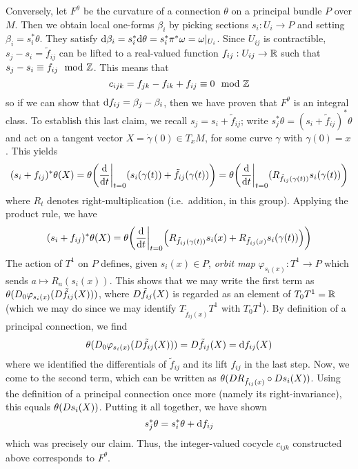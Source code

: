 \documentclass[parskip=half]{scrartcl}
\begin{document}
\begin{myproof}
	Conversely, let $F^\theta$ be the curvature of a connection $\theta$ on a principal bundle $P$ over $M$. Then we obtain local one-forms $\beta_i$ by picking sections $s_i:U_i\to P$ and setting $\beta_i=s_i^*\theta$. They satisfy $\mathrm{d} \beta_i=s_i^*\mathrm{d}\theta=s_i^*\pi^*\omega=\omega|_{U_i}$. Since $U_{ij}$ is contractible, $s_j-s_i=\tilde f_{ij}$ can be lifted to a real-valued function $f_{ij}:U_{ij}\to \mathbb{R}$ such that $s_j-s_i\equiv f_{ij}\mod {\mathbb{Z}}$. This means that 
	\begin{equation*}
		c_{ijk}=f_{jk}-f_{ik}+f_{ij}\equiv 0 \mod {\mathbb{Z}}
	\end{equation*}
	so if we can show that $\mathrm{d} f_{ij}=\beta_j-\beta_i$, then we have proven that $F^\theta$ is an integral class. To establish this last claim, we recall $s_j=s_i+\tilde f_{ij}$; write $s_j^*\theta=(s_i+\tilde f_{ij})^*\theta$ and act on a tangent vector $X=\dot\gamma(0)\in T_x M$, for some curve $\gamma$ with $\gamma(0)=x$. This yields
	\begin{equation*}
		(s_i+f_{ij})^*\theta(X)=\theta\bigg(\frac{\mathrm{d} }{\mathrm{d} t}\bigg|_{t=0}(s_i(\gamma(t))+ \tilde f_{ij}(\gamma(t))\bigg)
		=\theta\bigg(\frac{\mathrm{d} }{\mathrm{d} t}\bigg|_{t=0}(R_{\tilde f_{ij}(\gamma(t))}s_i(\gamma(t))\bigg)
	\end{equation*}
	where $R_t$ denotes right-multiplication (i.e.~addition, in this group). Applying the product rule, we have
	\begin{equation*}
		(s_i+f_{ij})^*\theta(X)
		=\theta\bigg(\frac{\mathrm{d} }{\mathrm{d} t}\bigg|_{t=0}\Big(R_{\tilde f_{ij}(\gamma(t))}s_i(x)
		+R_{\tilde f_{ij}(x)}s_i(\gamma(t))\Big)\bigg)
	\end{equation*}
	The action of $T^1$ on $P$ defines, given $s_i(x)\in P$, \emph{orbit map} $\varphi_{s_i(x)}:T^1\to P$ which sends $a\mapsto R_a(s_i(x))$. This shows that we may write the first term as $\theta(D_{0} \varphi_{s_i(x)}(D \tilde f_{ij}(X)))$, where $D \tilde f_{ij}(X)$ is regarded as an element of $T_0 T^1=\mathbb{R}$ (which we may do since we may identify $T_{\tilde f_{ij}(x)}T^1$ with $T_0T^1$). By definition of a principal connection, we find
	\begin{equation*}
		\theta(D_0\varphi_{s_i(x)}(D \tilde f_{ij}(X)))=D \tilde f_{ij}(X)=\mathrm{d} f_{ij}(X)
	\end{equation*}
	where we identified the differentials of $\tilde f_{ij}$ and its lift $f_{ij}$ in the last step. Now, we come to the second term, which can be written as $\theta(D R_{\tilde f_{ij}(x)}\circ D s_i(X))$. Using the definition of a principal connection once more (namely its right-invariance), this equals $\theta(D s_i(X))$. Putting it all together, we have shown
	\begin{equation*}
		s_j^*\theta=s_i^*\theta+\mathrm{d} f_{ij}
	\end{equation*}
	which was precisely our claim. Thus, the integer-valued cocycle $c_{ijk}$ constructed above corresponds to $F^\theta$.
\end{myproof}
\end{document}
